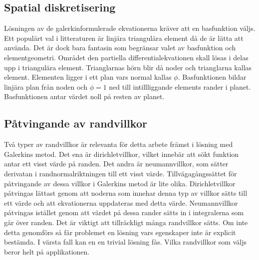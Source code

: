 \subsection{Spatial diskretisering}

Lösningen av de galerkinformulerade ekvationerna kräver att en basfunktion väljs.
Ett populärt val i litteraturen är linjära triangulära element då de
är lätta att använda. Det är dock bara fantasin som begränsar valet av basfunktion
och elementgeometri.
\cite{johnson2009}\cite{lewis04}\cite{reddy93}\cite{fem50} Området den
partiella differentialekvationen skall lösas i delas upp i triangulära element.
Trianglarnas hörn blir då noder och trianglarna kallas element. Elementen ligger i ett plan vars normal kallas $\phi$. Basfunktionen bildar linjära plan från noden och $\phi=1$ ned till intillliggande elements rander i planet. Basfunktionen antar värdet noll på resten av planet.\cite{johnson2009}

\subsection{Påtvingande av randvillkor}
\label{subsec:boundaryenforcement}
Två typer av randvillkor är relevanta för detta arbete främst i lösning med Galerkins 
metod. Det ena är dirichletvillkor, vilket
innebär att sökt funktion antar ett visst värde på randen. Det andra är neumannvillkor,
som sätter derivatan i randnormalriktningen till ett visst värde. Tillvägagångssättet
för påtvingande av dessa villkor i Galerkins metod är lite olika. Dirichletvillkor
påtvingas lättast genom att noderna som innehar denna typ av villkor sätts till ett värde
och att ekvationerna uppdateras med detta värde. Neumannvillkor påtvingas istället
genom att värdet på dessa rander sätts in i integralerna som går över randen. Det
är viktigt att tillräckligt många randvillkor sätts. Om inte detta genomförs
så får problemet en lösning vars egenskaper inte är explicit bestämda. I värsta fall kan en en trivial lösning fås. Vilka randvillkor som väljs beror helt
på applikationen.
